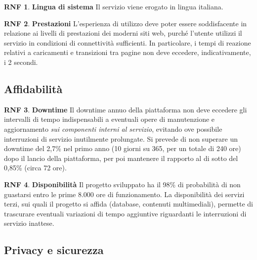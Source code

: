 \documentclass[11pt, a4paper]{article}
\theoremstyle{definition}
\newtheorem{nonfuncreq}{RNF} %
\begin{document}
\begin{nonfuncreq}
\textbf{Lingua di sistema }
Il servizio viene erogato in lingua italiana.

\end{nonfuncreq}

\begin{nonfuncreq}
\textbf{Prestazioni }
L'esperienza di utilizzo deve poter essere soddisfacente in relazione
ai livelli di prestazioni dei moderni siti web, purché l'utente utilizzi
il servizio in condizioni di connettività sufficienti. In particolare,
i tempi di reazione relativi a caricamenti e transizioni tra pagine non
deve eccedere, indicativamente, i 2 secondi.
\end{nonfuncreq}

\subsection{Affidabilità}

\begin{nonfuncreq}
\label{downtime}
\textbf{Downtime }
Il downtime annuo della piattaforma non deve eccedere gli intervalli di
tempo indispensabili a eventuali opere di manutenzione e aggiornamento
\textit{sui componenti interni al servizio}, evitando ove possibile
interruzioni di servizio inutilmente prolungate. Si prevede di non superare
un downtime del 2,7\% nel primo anno (10 giorni su 365, per un totale di 240
ore) dopo il lancio della piattaforma, per poi mantenere il rapporto al di
sotto del 0,85\% (circa 72 ore).
\end{nonfuncreq}

\begin{nonfuncreq}
\textbf{Disponibilità }
\label{disponibilita}
Il progetto sviluppato ha il 98\% di probabilità di non guastarsi entro le
prime 8.000 ore di funzionamento. La disponibilità dei servizi terzi, sui
quali il progetto si affida (database, contenuti multimediali), permette di
trascurare eventuali variazioni di tempo aggiuntive riguardanti le
interruzioni di servizio inattese.
\end{nonfuncreq}

\subsection{Privacy e sicurezza}
\end{document}
